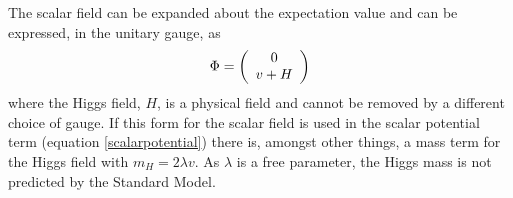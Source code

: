 The scalar field can be expanded about the expectation value and can be expressed, in the unitary gauge, as
\begin{equation} \label{cmplxdoublet}
\vspace{0.2cm}
\Phi =
\left( \begin{array}{c}
0 \\v + H
\end{array}
\right)
\vspace{0.2cm}
\end{equation}
where the Higgs field, $H$, is a physical field and cannot be removed by a different choice of gauge. If this form for the scalar field is used in the scalar potential term (equation \ref{scalarpotential}) there is, amongst other things, a mass term for the Higgs field with $m_H = 2\lambda v$. As $\lambda$ is  a free parameter, the Higgs mass is not predicted by the Standard Model.
 
